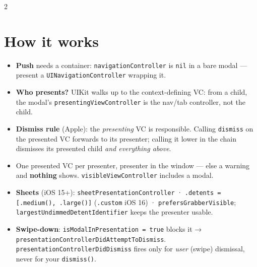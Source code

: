 \documentclass[8pt]{extarticle}
\begin{document}
\begin{multicols}{2}
\raggedright

\section{How it works}
\begin{itemize}
  \item \textbf{Push} needs a container: \texttt{navigationController} is \texttt{nil} in a
        bare modal — present a \texttt{UINavigationController} wrapping it.
  \item \textbf{Who presents?} UIKit walks up to the context-defining VC: from a child, the
        modal's \texttt{presentingViewController} is the nav/tab controller, not the child.
  \item \textbf{Dismiss rule} (Apple): the \emph{presenting} VC is responsible. Calling
        \texttt{dismiss} on the presented VC forwards to its presenter; calling it lower in
        the chain dismisses its presented child \emph{and everything above}.
  \item One presented VC per presenter, presenter in the window — else a warning and
        \textbf{nothing} shows. \texttt{visibleViewController} includes a modal.
  \item \textbf{Sheets} (iOS 15+): \texttt{sheetPresentationController} ·
        \texttt{.detents = [.medium(), .large()]} (\texttt{.custom} iOS 16) ·
        \texttt{prefersGrabberVisible}; \\ \texttt{largestUndimmedDetentIdentifier} keeps the
        presenter usable.
  \item \textbf{Swipe-down}: \texttt{isModalInPresentation = true} blocks it →
        \texttt{presentationControllerDidAttemptToDismiss}. \texttt{presentationController\-DidDismiss}
        fires only for \emph{user} (swipe) dismissal, never for your \texttt{dismiss()}.
\end{itemize}


\end{multicols}
\end{document}
